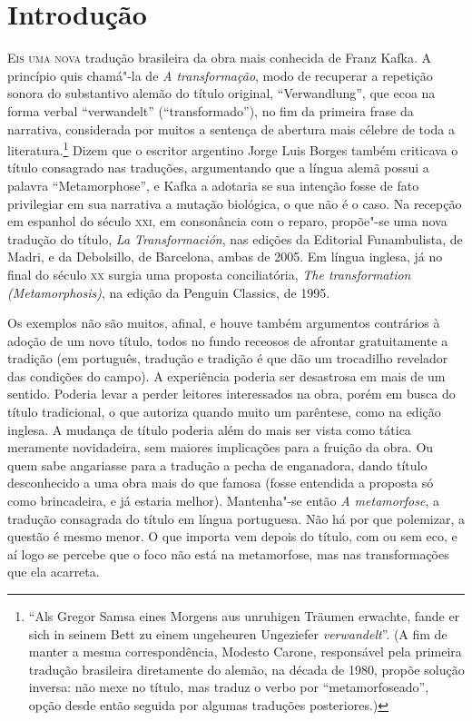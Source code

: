 
\chapter*{Introdução}

\textsc{Eis uma nova} tradução brasileira da obra mais conhecida de Franz Kafka.
A princípio quis chamá"-la de \textit{A transformação}, modo de
recuperar a repetição sonora do substantivo alemão do título original,
“Verwandlung”, que ecoa na forma verbal “verwandelt” (“transformado”),
no fim da primeira frase da narrativa, considerada por muitos a
sentença de abertura mais célebre de toda a literatura.\footnote{ “Als 
Gregor Samsa eines Morgens aus unruhigen
Träumen erwachte, fande er sich in seinem Bett zu einem ungeheuren
Ungeziefer \textit{verwandelt}”. (A fim de manter a mesma
correspondência, Modesto Carone, responsável pela primeira tradução
brasileira diretamente do alemão, na década de 1980,
propõe solução inversa: não mexe no título, mas traduz o verbo por
“metamorfoseado”, opção desde então seguida por algumas traduções
posteriores.)} Dizem que o escritor argentino Jorge Luis Borges também
criticava o título consagrado nas traduções, argumentando que a língua
alemã possui a palavra “Metamorphose”, e Kafka a adotaria se sua
intenção fosse de fato privilegiar em sua narrativa a mutação
biológica, o que não é o caso. Na recepção em espanhol do século \textsc{xxi}, em
consonância com o reparo, propõe"-se uma nova tradução do título,
\textit{La Transformación}, nas edições da Editorial Funambulista, de
Madri, e da Debolsillo, de Barcelona, ambas de 2005. Em língua inglesa,
já no final do século \textsc{xx} surgia uma proposta conciliatória, \textit{The
transformation (Metamorphosis)}, na edição da Penguin Classics, de
1995.

Os exemplos não são muitos, afinal, e houve também argumentos contrários
à adoção de um novo título, todos no fundo receosos de afrontar
gratuitamente a tradição (em português, tradução e tradição é que dão
um trocadilho revelador das condições do campo). A experiência poderia
ser desastrosa em mais de um sentido. Poderia levar a perder leitores
interessados na obra, porém em busca do título tradicional, o que
autoriza quando muito um parêntese, como na edição inglesa. A
mudança de título poderia além do mais ser vista como tática meramente
novidadeira, sem maiores implicações para a fruição da obra. Ou quem
sabe angariasse para a tradução a pecha de enganadora, dando título
desconhecido a uma obra mais do que famosa (fosse entendida a proposta
só como brincadeira, e já estaria melhor). Mantenha"-se então
\textit{A metamorfose}, a tradução consagrada do título em língua
portuguesa. Não há por que polemizar, a questão é mesmo menor. O que
importa vem depois do título, com ou sem eco, e aí logo se percebe que
o foco não está na metamorfose, mas nas transformações que ela
acarreta.

